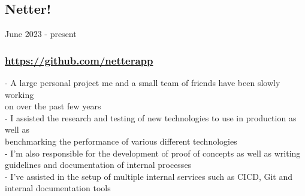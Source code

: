 \subsection{Netter!} June 2023 - present \\
\subsubsection{\href{https://github.com/netterapp}{https://github.com/netterapp}}
-\:  A large personal project me and a small team of friends have been slowly working \\ 
\ind on over the past few years \\
-\:  I assisted the research and testing of new technologies to use in production as well as \\ 
\ind benchmarking the performance of various different technologies \\
-\:  I'm also responsible for the development of proof of concepts as well as writing \\ 
\ind guidelines and documentation of internal processes \\
-\:  I've assisted in the setup of multiple internal services such as CICD, Git and \\
\ind internal documentation tools\\




